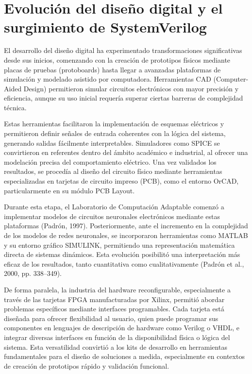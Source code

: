 \section{Evolución del diseño digital y el surgimiento de SystemVerilog}
El desarrollo del diseño digital ha experimentado transformaciones significativas desde sus inicios, comenzando con la creación de prototipos físicos mediante placas de pruebas (protoboards) hasta llegar a avanzadas plataformas de simulación y modelado asistido por computadora. Herramientas CAD (Computer-Aided Design) permitieron simular circuitos electrónicos con mayor precisión y eficiencia, aunque su uso inicial requería superar ciertas barreras de complejidad técnica.

Estas herramientas facilitaron la implementación de esquemas eléctricos y permitieron definir señales de entrada coherentes con la lógica del sistema, generando salidas fácilmente interpretables. Simuladores como SPICE se convirtieron en referentes dentro del ámbito académico e industrial, al ofrecer una modelación precisa del comportamiento eléctrico. Una vez validados los resultados, se procedía al diseño del circuito físico mediante herramientas especializadas en tarjetas de circuito impreso (PCB), como el entorno OrCAD, particularmente en su módulo PCB Layout.

Durante esta etapa, el Laboratorio de Computación Adaptable comenzó a implementar modelos de circuitos neuronales electrónicos mediante estas plataformas (Padrón, 1997). Posteriormente, ante el incremento en la complejidad de los modelos de redes neuronales, se incorporaron herramientas como MATLAB y su entorno gráfico SIMULINK, permitiendo una representación matemática directa de sistemas dinámicos. Esta evolución posibilitó una interpretación más eficaz de los resultados, tanto cuantitativa como cualitativamente (Padrón et al., 2000, pp. 338–349).

De forma paralela, la industria del hardware reconfigurable, especialmente a través de las tarjetas FPGA manufacturadas por Xilinx, permitió abordar problemas específicos mediante interfaces programables. Cada tarjeta está diseñada para ofrecer flexibilidad al usuario, quien puede programar sus componentes en lenguajes de descripción de hardware como Verilog o VHDL, e integrar diversas interfaces en función de la disponibilidad física o lógica del sistema. Esta versatilidad convirtió a los kits de desarrollo en herramientas fundamentales para el diseño de soluciones a medida, especialmente en contextos de creación de prototipos rápido y validación funcional.

